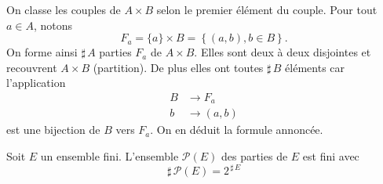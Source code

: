 \begin{demo}
 On classe les couples de $A \times B$ selon le premier élément du couple. Pour tout $a\in A$, notons
\begin{displaymath}
 F_a = \{a\}\times B = \left\lbrace (a,b) , b\in B\right\rbrace .
\end{displaymath}
On forme ainsi $\sharp\,A$ parties $F_a$ de $A\times B$. Elles sont deux à deux disjointes et recouvrent $A\times B$ (partition). De plus elles ont toutes $\sharp\,B$ éléments car l'application
\begin{displaymath}
 \begin{aligned}
  B &\rightarrow F_a\\
  b &\rightarrow (a,b)
 \end{aligned}
\end{displaymath}
est une bijection de $B$ vers $F_a$. On en déduit la formule annoncée.
\end{demo}
\clearpage
{}
\begin{propn}
Soit $E$ un ensemble fini. L'ensemble $\mathcal P(E)$ des parties de $E$ est fini avec
\begin{displaymath}
 \sharp\, \mathcal P(E) = 2^{\,\sharp\, E}
\end{displaymath}
\end{propn}
